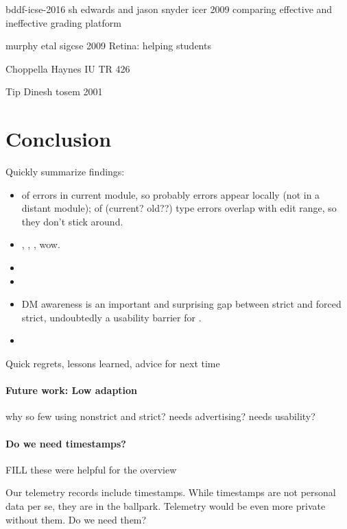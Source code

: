 \documentclass[english,submission,cleveref]{programming}
\begin{document}
bddf-icse-2016
 sh edwards and jason snyder icer 2009 comparing effective and ineffective grading platform

murphy etal sigcse 2009 Retina: helping students

Choppella Haynes IU TR 426

Tip Dinesh tosem 2001



\section{Conclusion}
\label{s:conclusion}

Quickly summarize findings:

\begin{itemize}
  \item
     of errors in current module, so probably errors appear locally (not in a distant module);
     of (current? old??) type errors overlap with edit range, so they don't stick around.
  \item
     \mnocheck{},   \mnonstrict{},   \mstrict{}, wow.
  \item
  \item
  \item
    DM awareness is an important and surprising gap between strict
    and forced strict, undoubtedly a usability barrier for \mstrict{}.
  \item
\end{itemize}

Quick regrets, lessons learned, advice for next time

\paragraph{Future work: Low adaption}

why so few using nonstrict and strict?
needs advertising?
needs usability?


\paragraph{Do we need timestamps?}

FILL these were helpful for the overview

Our telemetry records include timestamps.
While timestamps are not personal data per se, they are in the ballpark.
Telemetry would be even more private without them.
Do we need them?
\end{document}
